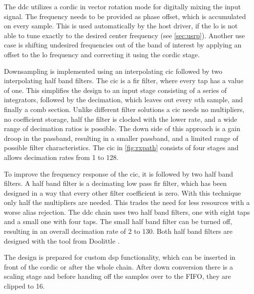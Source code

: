 \documentclass[12pt,a4paper,parskip=full]{scrartcl}
\begin{document}
The \gls{ddc} utilizes a \gls{cordic} in vector rotation mode for digitally
mixing the input signal. The frequency needs to be provided as phase offset,
which is accumulated on every sample. This is used automatically by the host driver,
if the \gls{lo} is not able to tune exactly to the desired center frequency (see \cref{sec:usrp}).
Another use case is shifting undesired frequencies out of the band of
interest by applying an offset to the \gls{lo} frequency and correcting
it using the \gls{cordic} stage.

Downsampling is implemented using an interpolating \gls{cic} followed by two
interpolating half band filters. The \gls{cic} is a \gls{fir} filter, where every tap has
a value of one. This simplifies the design to an input stage consisting
of a series of integrators, followed by the decimation, which leaves out every
$n$th sample, and finally a comb section. Unlike different filter solutions
a \gls{cic} needs no multipliers, no coefficient storage, half the filter is
clocked with the lower rate, and a wide range of decimation ratios is possible. The down
side of this approach is a gain droop in the passband, resulting in a smaller
passband, and a limited range of possible filter characteristics\cite{hog81}.
The \gls{cic} in \cref{fig:rxpath} consists of four stages and allows decimation
rates from 1 to 128.

To improve the frequency response of the \gls{cic}, it is followed by two half band
filters. A half band filter is a decimating low pass \gls{fir} filter, which has
been designed in a way that every other filter coefficient is zero. With this technique
only half the multipliers are needed. This trades the need for less resources with
a worse alias rejection. The \gls{ddc} chain uses two half band filters,
one with eight taps and a small one with four taps. The small half band filter can be
turned off, resulting in an overall decimation rate of 2 to 130. Both half band
filters are designed with the tool from Doolittle \cite{halfband}.

The design is prepared for custom \gls{dsp} functionality, which can be inserted in front
of the cordic or after the whole chain. After down conversion there is a scaling stage and
before handing off the samples over to the FIFO, they are clipped to \SI{16}{\bit}.
\end{document}
